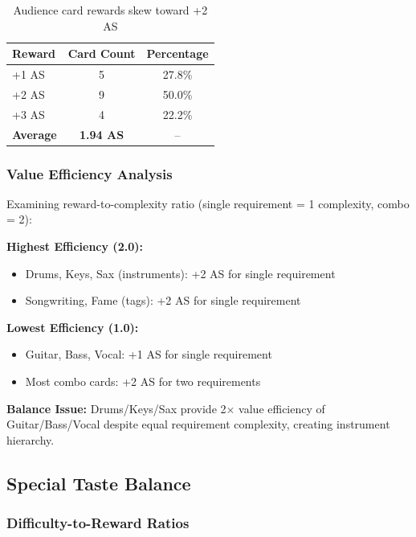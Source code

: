 \documentclass[11pt,a4paper]{article}
\begin{document}
\begin{table}[H]
\centering
\begin{tabular}{lcc}
\toprule
\textbf{Reward} & \textbf{Card Count} & \textbf{Percentage} \\
\midrule
+1 AS & 5 & 27.8\% \\
+2 AS & 9 & 50.0\% \\
+3 AS & 4 & 22.2\% \\
\midrule
\textbf{Average} & \textbf{1.94 AS} & -- \\
\bottomrule
\end{tabular}
\caption{Audience card rewards skew toward +2 AS}
\end{table}

\subsubsection{Value Efficiency Analysis}

Examining reward-to-complexity ratio (single requirement = 1 complexity, combo = 2):

\textbf{Highest Efficiency (2.0):}
\begin{itemize}[itemsep=0pt]
    \item Drums, Keys, Sax (instruments): +2 AS for single requirement
    \item Songwriting, Fame (tags): +2 AS for single requirement
\end{itemize}

\textbf{Lowest Efficiency (1.0):}
\begin{itemize}[itemsep=0pt]
    \item Guitar, Bass, Vocal: +1 AS for single requirement
    \item Most combo cards: +2 AS for two requirements
\end{itemize}

\textbf{Balance Issue:} Drums/Keys/Sax provide 2$\times$ value efficiency of Guitar/Bass/Vocal despite equal requirement complexity, creating instrument hierarchy.

\subsection{Special Taste Balance}

\subsubsection{Difficulty-to-Reward Ratios}
\end{document}
